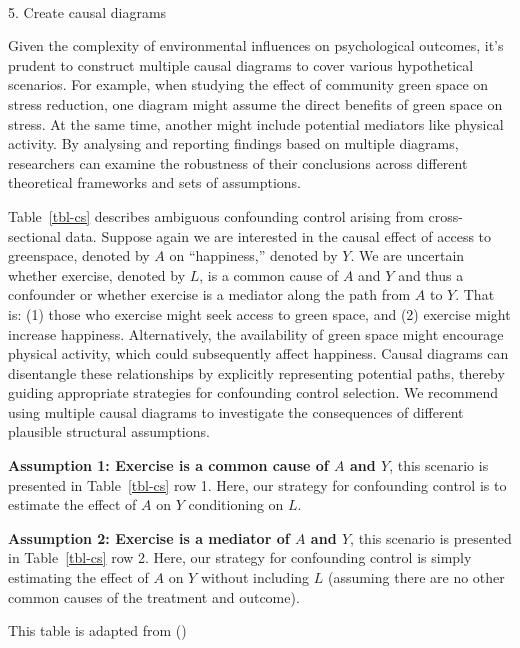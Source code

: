 \documentclass[
  single column]{article}
\makeatletter
\let\oldparagraph\paragraph
\renewcommand{\paragraph}{
    \@ifstar
      \xxxParagraphStar
      \xxxParagraphNoStar
  }
\newcommand{\xxxParagraphStar}[1]{\oldparagraph*{#1}\mbox{}}
\newcommand{\xxxParagraphNoStar}[1]{\oldparagraph{#1}\mbox{}}
\makeatother
\begin{document}
\paragraph{5. Create causal diagrams}\label{create-causal-diagrams}

Given the complexity of environmental influences on psychological
outcomes, it's prudent to construct multiple causal diagrams to cover
various hypothetical scenarios. For example, when studying the effect of
community green space on stress reduction, one diagram might assume the
direct benefits of green space on stress. At the same time, another
might include potential mediators like physical activity. By analysing
and reporting findings based on multiple diagrams, researchers can
examine the robustness of their conclusions across different theoretical
frameworks and sets of assumptions.

Table~\ref{tbl-cs} describes ambiguous confounding control arising from
cross-sectional data. Suppose again we are interested in the causal
effect of access to greenspace, denoted by \(A\) on ``happiness,''
denoted by \(Y\). We are uncertain whether exercise, denoted by \(L\),
is a common cause of \(A\) and \(Y\) and thus a confounder or whether
exercise is a mediator along the path from \(A\) to \(Y\). That is: (1)
those who exercise might seek access to green space, and (2) exercise
might increase happiness. Alternatively, the availability of green space
might encourage physical activity, which could subsequently affect
happiness. Causal diagrams can disentangle these relationships by
explicitly representing potential paths, thereby guiding appropriate
strategies for confounding control selection. We recommend using
multiple causal diagrams to investigate the consequences of different
plausible structural assumptions.

\textbf{Assumption 1: Exercise is a common cause of \(A\) and \(Y\)},
this scenario is presented in Table~\ref{tbl-cs} row 1. Here, our
strategy for confounding control is to estimate the effect of \(A\) on
\(Y\) conditioning on \(L\).

\textbf{Assumption 2: Exercise is a mediator of \(A\) and \(Y\)}, this
scenario is presented in Table~\ref{tbl-cs} row 2. Here, our strategy
for confounding control is simply estimating the effect of \(A\) on
\(Y\) without including \(L\) (assuming there are no other common causes
of the treatment and outcome).

\begin{table}

\caption{\label{tbl-cs}This table is adapted from
()}

\centering{

\examplecrosssection

}

\end{table}%
\end{document}
